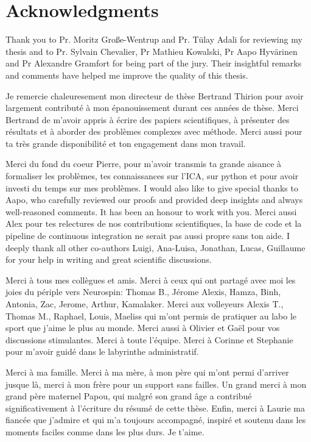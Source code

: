 
\bigskip

\begingroup
\let\clearpage\relax
\let\cleardoublepage\relax
\let\cleardoublepage\relax
\chapter*{Acknowledgments}
Thank you to Pr. Moritz Gro{\ss}e-Wentrup and Pr. T{\"u}lay Adali for reviewing
my thesis and to Pr. Sylvain Chevalier, Pr Mathieu Kowalski, Pr Aapo
Hyv{\"a}rinen and Pr Alexandre Gramfort for being part of the jury.
Their insightful remarks and comments have helped me improve the quality of this thesis.

Je remercie chaleuresement mon directeur de thèse Bertrand Thirion pour avoir
largement contributé à mon épanouissement durant ces années de thèse. Merci
Bertrand de m'avoir appris à écrire des papiers scientifiques,
à présenter des résultats et à aborder des problèmes complexes avec méthode.
Merci aussi pour ta très grande disponibilité et ton engagement dans mon travail.

Merci du fond du coeur Pierre, pour m'avoir transmis ta grande aisance à
formaliser les problèmes, tes connaissances sur l'ICA, sur python et pour avoir
investi du temps sur mes problèmes.
I would also like to give special thanks to Aapo, who carefully reviewed our proofs and provided deep insights and always well-reasoned comments. It has been an honour to work with you.
Merci aussi Alex pour tes relectures de nos contributions
scientifiques, la base de code et la pipeline de continuous
integration ne serait pas aussi propre sans ton aide.
I deeply thank all other co-authors Luigi, Ana-Luisa, Jonathan, Lucas, Guillaume
for your help in writing and great scientific discussions.

Merci à tous mes collègues et amis. Merci à ceux qui ont partagé avec moi les joies du
périple vers Neurospin: Thomas B., Jérome
Alexis, Hamza, Binh, Antonia, Zac, Jerome, Arthur, Kamalaker. Merci aux volleyeurs
Alexis T., Thomas M., Raphael, Louis, Maeliss qui m'ont permis de pratiquer au
labo le sport que j'aime le plus au monde.
Merci aussi à Olivier et Gaël pour vos discussions stimulantes.
Merci à toute l'équipe. Merci à Corinne et Stephanie pour m'avoir guidé dans le labyrinthe
administratif.

Merci à ma famille. Merci à ma mère, à mon père qui m'ont permi d'arriver
jusque là, merci à mon frère pour un support sans failles. Un grand merci à mon grand
père maternel Papou, qui malgré son grand âge a contribué significativement à
l'écriture du résumé de cette thèse.
Enfin, merci à Laurie ma fiancée que j'admire et qui m'a toujours accompagné,
inspiré et soutenu dans les moments faciles comme dans les plus durs. Je t'aime.

\endgroup

